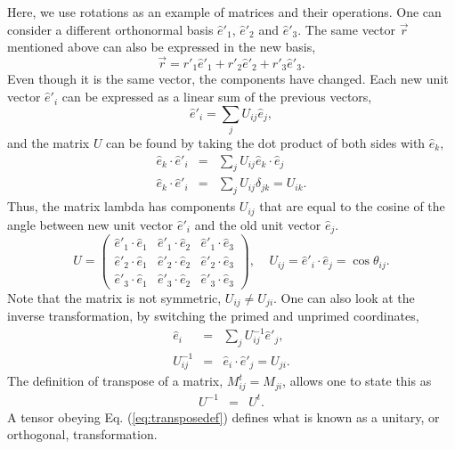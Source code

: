 Here, we use rotations as an example of matrices and their operations. One can consider a different orthonormal basis $\hat{e}'_1$, $\hat{e}'_2$ and $\hat{e}'_3$. The same vector $\vec{r}$ mentioned above can also be expressed in the new basis,
\begin{equation}
\vec{r}=r'_1\hat{e}'_1+r'_2\hat{e}'_2+r'_3\hat{e}'_3.
\end{equation}
Even though it is the same vector, the components have changed. Each new unit vector $\hat{e}'_i$ can be expressed as a linear sum of the previous vectors,
\begin{equation}
\hat{e}'_i=\sum_j U_{ij}\hat{e}_j,
\end{equation}
and the matrix $U$ can be found by taking the dot product of both sides with $\hat{e}_k$,
\begin{eqnarray}
\nonumber
\hat{e}_k\cdot\hat{e}'_i&=&\sum_jU_{ij}\hat{e}_k\cdot\hat{e}_j\\
\label{eq:lambda_angles}
\hat{e}_k\cdot\hat{e}'_i&=&\sum_jU_{ij}\delta_{jk}=U_{ik}.
\end{eqnarray}
Thus, the matrix lambda has components $U_{ij}$ that are equal to the cosine of the angle between new unit vector $\hat{e}'_i$ and the old unit vector $\hat{e}_j$.
\begin{equation}
U = \left(\begin{array}{ccc}
\hat{e}'_1\cdot\hat{e}_1& \hat{e}'_1\cdot\hat{e}_2& \hat{e}'_1\cdot\hat{e}_3\\
\hat{e}'_2\cdot\hat{e}_1& \hat{e}'_2\cdot\hat{e}_2& \hat{e}'_2\cdot\hat{e}_3\\
\hat{e}'_3\cdot\hat{e}_1& \hat{e}'_3\cdot\hat{e}_2& \hat{e}'_3\cdot\hat{e}_3
\end{array}\right),~~~~~U_{ij}=\hat{e}'_i\cdot\hat{e}_j=\cos\theta_{ij}.
\end{equation}
Note that the matrix is not symmetric, $U_{ij}\ne U_{ji}$. One can also look at the inverse transformation, by switching the primed and unprimed coordinates,
\begin{eqnarray}
\label{eq:inverseU}
\hat{e}_i&=&\sum_jU^{-1}_{ij}\hat{e}'_j,\\
\nonumber
U^{-1}_{ij}&=&\hat{e}_i\cdot\hat{e}'_j=U_{ji}.
\end{eqnarray}
The definition of transpose of a matrix, $M^{t}_{ij}=M_{ji}$, allows one to state this as
\begin{eqnarray}
\label{eq:transposedef}
U^{-1}&=&U^{t}.
\end{eqnarray}
A tensor obeying Eq. (\ref{eq:transposedef}) defines what is known as a unitary, or orthogonal, transformation.

